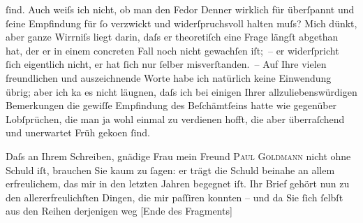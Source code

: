                ſind. Auch weiſs ich nicht, ob man den Fedor Denner wirklich für überſpannt {\pb}und ſeine
               Empfindung für ſo verzwickt und widerſpruchsvoll halten muſs? Mich dünkt, aber ganze
               Wirrniſs liegt darin, daſs er theoretiſch eine Frage längſt abgethan hat, der er in
               einem concreten Fall noch nicht gewachſen iſt; – er widerſpricht ſich eigentlich
               nicht, er hat ſich nur ſelber misverſtanden. – Auf Ihre vielen freundlichen und
                  auszeich{\pb}nende Worte habe ich natürlich keine Einwendung übrig; aber
               ich ka{\geminationn} es nicht läugnen, daſs ich bei einigen Ihrer
               allzuliebenswürdigen Bemerkungen die gewiſſe Empfindung des Beſchämtſeins hatte wie
               gegenüber Lobſprüchen, die man ja wohl einmal zu verdienen hofft, die aber
               überraſchend und unerwartet Früh geko{\geminationm}en ſind.\pend
           
\pstart
           {\pb}Daſs an Ihrem Schreiben, gnädige Frau mein Freund \textsc{Paul Goldmann} nicht ohne Schuld iſt, brauchen Sie kaum zu ſagen: er trägt die Schuld beinahe
               an allem erfreulichem, das mir in den letzten Jahren begegnet iſt. Ihr Brief gehört
               nun zu den allererfreulichſten Dingen, die mir paſſiren konnten – und da Sie ſich
               ſelbſt aus den Reihen derjenigen weg {[}Ende des Fragments{]}\pend
           \endnumbering{}  
      